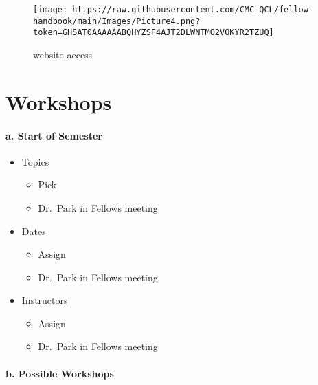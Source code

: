 \documentclass[
]{book}
\providecommand{\tightlist}{%
  \setlength{\itemsep}{0pt}\setlength{\parskip}{0pt}}
\begin{document}
\begin{figure}
\centering
\texttt{[image: https://raw.githubusercontent.com/CMC-QCL/fellow-handbook/main/Images/Picture4.png?token=GHSAT0AAAAAABQHYZSF4AJT2DLWNTMO2VOKYR2TZUQ]}
\caption{website access}
\end{figure}

\hypertarget{workshops}{%
\chapter{Workshops}\label{workshops}}

\hypertarget{a.-start-of-semester}{%
\subsubsection{\texorpdfstring{a. Start of Semester }{a. Start of Semester }}\label{a.-start-of-semester}}

\begin{itemize}
\tightlist
\item
  Topics

  \begin{itemize}
  \tightlist
  \item
    Pick
  \item
    Dr.~Park in Fellows meeting
  \end{itemize}
\item
  Dates

  \begin{itemize}
  \tightlist
  \item
    Assign
  \item
    Dr.~Park in Fellows meeting
  \end{itemize}
\item
  Instructors

  \begin{itemize}
  \tightlist
  \item
    Assign
  \item
    Dr.~Park in Fellows meeting
  \end{itemize}
\end{itemize}

\hypertarget{b.-possible-workshops}{%
\subsubsection{\texorpdfstring{b. Possible Workshops }{b. Possible Workshops }}\label{b.-possible-workshops}}
\end{document}
